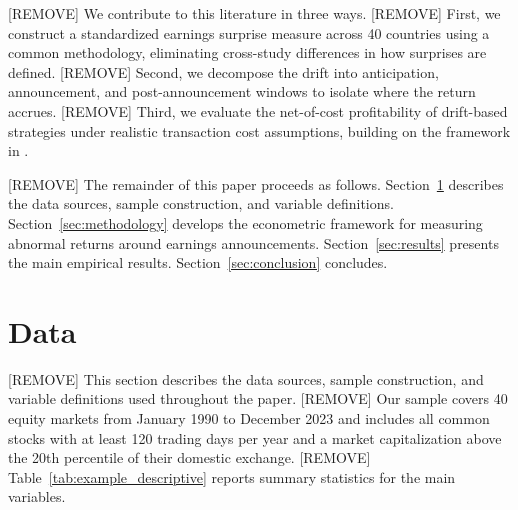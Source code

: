 \documentclass[12pt]{article}
\begin{document}
[REMOVE] We contribute to this literature in three ways. [REMOVE] First, we construct a standardized earnings surprise measure across 40 countries using a common methodology, eliminating cross-study differences in how surprises are defined. [REMOVE] Second, we decompose the drift into anticipation, announcement, and post-announcement windows to isolate where the return accrues. [REMOVE] Third, we evaluate the net-of-cost profitability of drift-based strategies under realistic transaction cost assumptions, building on the framework in \citet{FamaFrench_2015}.

[REMOVE] The remainder of this paper proceeds as follows. Section~\ref{sec:data} describes the data sources, sample construction, and variable definitions. Section~\ref{sec:methodology} develops the econometric framework for measuring abnormal returns around earnings announcements. Section~\ref{sec:results} presents the main empirical results. Section~\ref{sec:conclusion} concludes.




\section{Data}\label{sec:data}

[REMOVE] This section describes the data sources, sample construction, and variable definitions used throughout the paper. [REMOVE] Our sample covers 40 equity markets from January 1990 to December 2023 and includes all common stocks with at least 120 trading days per year and a market capitalization above the 20th percentile of their domestic exchange. [REMOVE] Table~\ref{tab:example_descriptive} reports summary statistics for the main variables.
\end{document}
